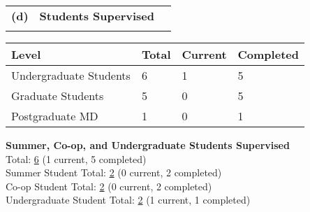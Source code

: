 \documentclass[11pt,notitlepage,english]{report}
\begin{document}

\begin{tabular}{L{.5cm} L{8cm} L{6.9cm}}
  \\
  \textbf{(d)} & \textbf{Students Supervised} \\
  \\
\end{tabular}

\begin{table}[H]
  \label{8d. Students Supervised}
  \centering
  \begin{tabular}{|l|l|l|l|}
    \rowcolor[HTML]{EFEFEF}
    \hline
    Level                  & Total & Current & Completed \\
    \hline
    Undergraduate Students & 6     & 1       & 5         \\
    \hline
    Graduate Students      & 5     & 0       & 5         \\
    \hline
    Postgraduate MD        & 1     & 0       & 1         \\
    \hline
  \end{tabular}
\end{table}

\noindent \textbf{Summer, Co-op, and Undergraduate Students Supervised}
\\

\noindent Total: \underline{6} (1 current, 5 completed) \\
Summer Student Total: \underline{2} (0 current, 2 completed) \\
Co-op Student Total: \underline{2} (0 current, 2 completed) \\
Undergraduate Student Total: \underline{2} (1 current, 1 completed) \\
\end{document}
